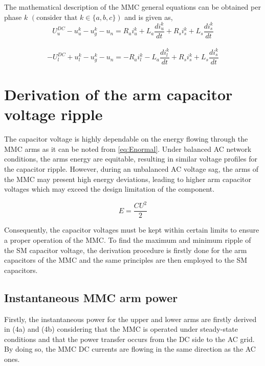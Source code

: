 \documentclass[journal]{IEEEtran}
\begin{document}
The mathematical description of the MMC general equations can be obtained per phase $k$ $(\mbox{consider that } k\in \{a,b,c\})$ and is given as,
~
\begin{equation}
U_{u}^{DC} - u_{u}^k - u_{g}^k - u_n = R_{a}i_{u}^k + L_{a}\frac{di_{u}^k}{dt} + R_{s}i_{s}^k + L_{s}\frac{di_{s}^k}{dt}
\label{eq:general_upper}
\end{equation}
~
\begin{equation}
-U_{l}^{DC} + u_{l}^k - u_{g}^k - u_n = -R_{a}i_{l}^k - L_{a}\frac{di_{l}^k}{dt} + R_{s}i_{s}^k + L_{s}\frac{di_{s}^k}{dt}
\label{eq:general_lower}
\end{equation}

\section{Derivation of the arm capacitor voltage ripple} \label{ripple}

The capacitor voltage is highly dependable on the energy flowing through the MMC arms as it can be noted from \eqref{eq:Enormal}. Under balanced AC network conditions, the arms energy are equitable, resulting in similar voltage profiles for the capacitor ripple. However, during an unbalanced AC voltage sag, the arms of the MMC may present high energy deviations, leading to higher arm capacitor voltages which may exceed the design limitation of the component. 

\begin{equation}
E = \dfrac{CU^2}{2}
\label{eq:Enormal}
\end{equation}

Consequently, the capacitor voltages must be kept within certain limits to ensure a proper operation of the MMC. To find the maximum and minimum ripple of the SM capacitor voltage, the derivation procedure is firstly done for the arm capacitors of the MMC and the same principles are then employed to the SM capacitors.

\subsection{Instantaneous MMC arm power}

Firstly, the instantaneous power for the upper and lower arms are firstly derived in (4a) and (4b) considering that the MMC is operated under steady-state conditions and that the power transfer occurs from the DC side to the AC grid. By doing so, the MMC DC currents are flowing in the same direction as the AC ones. 
\end{document}
